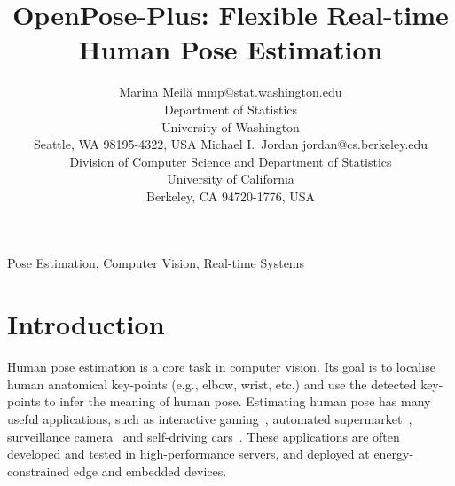 \documentclass[twoside,11pt]{article}
\begin{document}
\title{OpenPose-Plus: Flexible Real-time Human Pose Estimation}

\author{\name Marina Meil\u{a} \email mmp@stat.washington.edu \\
       \addr Department of Statistics\\
       University of Washington\\
       Seattle, WA 98195-4322, USA
       \AND
       \name Michael I.\ Jordan \email jordan@cs.berkeley.edu \\
       \addr Division of Computer Science and Department of Statistics\\
       University of California\\
       Berkeley, CA 94720-1776, USA}


\maketitle

\begin{abstract}%
\end{abstract}

\begin{keywords}
  Pose Estimation, Computer Vision, Real-time Systems
\end{keywords}

\section{Introduction}

Human pose estimation is a core task in computer vision.
Its goal is to localise human anatomical key-points (e.g., elbow, wrist, etc.)
and use the detected key-points to infer the meaning of human pose. 
Estimating human pose has many useful applications, such as interactive gaming~\citep{x}, automated supermarket~\citep{x},
surveillance camera~\citep{x} and self-driving cars~\citep{x}.
These applications are often developed and tested
in high-performance servers, and deployed at energy-constrained 
edge and embedded devices. 
\end{document}
